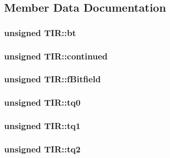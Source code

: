 \subsection{Member Data Documentation}
\hypertarget{structTIR_a4a7ec3b318275cd160bbe6064c35bc6f}{
\subsubsection[{bt}]{\setlength{\rightskip}{0pt plus 5cm}unsigned {\bf TIR::bt}}}
\label{structTIR_a4a7ec3b318275cd160bbe6064c35bc6f}
\hypertarget{structTIR_a4d6a133fb98ff66d15f737f87bf45eb0}{
\subsubsection[{continued}]{\setlength{\rightskip}{0pt plus 5cm}unsigned {\bf TIR::continued}}}
\label{structTIR_a4d6a133fb98ff66d15f737f87bf45eb0}
\hypertarget{structTIR_aa92bf19c08437139a11dbe3436587a74}{
\subsubsection[{fBitfield}]{\setlength{\rightskip}{0pt plus 5cm}unsigned {\bf TIR::fBitfield}}}
\label{structTIR_aa92bf19c08437139a11dbe3436587a74}
\hypertarget{structTIR_a7b3545f6bed24d43c250f7dbe1648d31}{
\subsubsection[{tq0}]{\setlength{\rightskip}{0pt plus 5cm}unsigned {\bf TIR::tq0}}}
\label{structTIR_a7b3545f6bed24d43c250f7dbe1648d31}
\hypertarget{structTIR_a54618e58aed8bc06dae46c61cdd631d3}{
\subsubsection[{tq1}]{\setlength{\rightskip}{0pt plus 5cm}unsigned {\bf TIR::tq1}}}
\label{structTIR_a54618e58aed8bc06dae46c61cdd631d3}
\hypertarget{structTIR_a4ffe0f8d8f19acd1643350c2a7e21e95}{
\subsubsection[{tq2}]{\setlength{\rightskip}{0pt plus 5cm}unsigned {\bf TIR::tq2}}}

